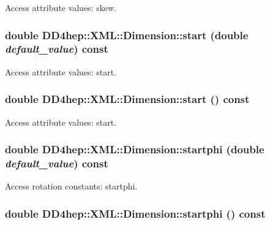 Access attribute values: skew. \hypertarget{struct_d_d4hep_1_1_x_m_l_1_1_dimension_ab9ac0dc372ba761ca855ac91063d1c00}{
\subsubsection[{start}]{\setlength{\rightskip}{0pt plus 5cm}double DD4hep::XML::Dimension::start (double {\em default\_\-value}) const}}
\label{struct_d_d4hep_1_1_x_m_l_1_1_dimension_ab9ac0dc372ba761ca855ac91063d1c00}


Access attribute values: start. \hypertarget{struct_d_d4hep_1_1_x_m_l_1_1_dimension_a78ee4ef68b16aed998894ef370e9a45e}{
\subsubsection[{start}]{\setlength{\rightskip}{0pt plus 5cm}double DD4hep::XML::Dimension::start () const}}
\label{struct_d_d4hep_1_1_x_m_l_1_1_dimension_a78ee4ef68b16aed998894ef370e9a45e}


Access attribute values: start. \hypertarget{struct_d_d4hep_1_1_x_m_l_1_1_dimension_ab67ae37dfa868013a7237414f2cb8b76}{
\subsubsection[{startphi}]{\setlength{\rightskip}{0pt plus 5cm}double DD4hep::XML::Dimension::startphi (double {\em default\_\-value}) const}}
\label{struct_d_d4hep_1_1_x_m_l_1_1_dimension_ab67ae37dfa868013a7237414f2cb8b76}


Access rotation constants: startphi. \hypertarget{struct_d_d4hep_1_1_x_m_l_1_1_dimension_a0def6c6a10feb3448baea92a3dc3504d}{
\subsubsection[{startphi}]{\setlength{\rightskip}{0pt plus 5cm}double DD4hep::XML::Dimension::startphi () const}}
\label{struct_d_d4hep_1_1_x_m_l_1_1_dimension_a0def6c6a10feb3448baea92a3dc3504d}


